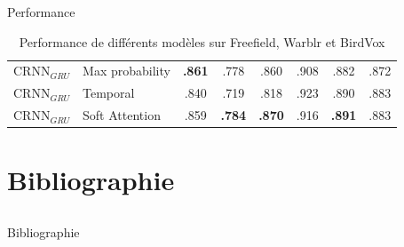 \documentclass[compress,xcolor=table]{beamer}
\begin{document}
\begin{frame}{Performance}
\begin{table}[h]
{\begin{tabular}{llcccccc}
                \midrule
                $\textrm{CRNN}_{GRU}$                   & Max probability          & \textbf{.861}                     & .778                           & .860                        & .908          & .882          & .872          \\
                $\textrm{CRNN}_{GRU}$                   & Temporal                 & .840                              & .719                           & .818                        & .923          & .890          & .883          \\
                $\textrm{CRNN}_{GRU}$                   & Soft Attention           & .859                              & \textbf{.784}                  & \textbf{.870}               & .916          & \textbf{.891} & .883          \\
                \bottomrule
            \end{tabular}
        }
        \caption{Performance de différents modèles sur Freefield, Warblr et BirdVox}
        \label{tab:performance}
    \end{table}

\end{frame}

\section{Bibliographie} \subsection{}

\begin{frame}[allowframebreaks]{Bibliographie}

    \printbibliography[heading=none]

\end{frame}
\end{document}
